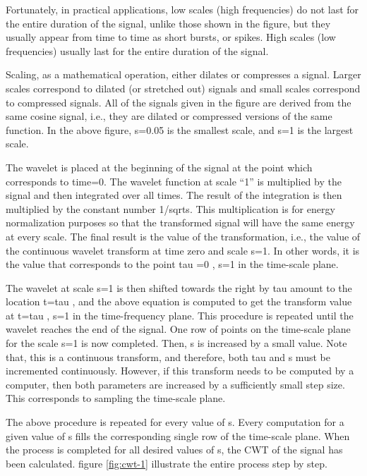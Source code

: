 \documentclass[12pt, a4paper, twoside]{report}
\begin{document}
Fortunately, in practical applications, low scales (high frequencies) do not last for the entire duration of the signal, unlike those shown in the figure, but they usually appear from time to time as short bursts, or spikes. High scales (low frequencies) usually last for the entire duration of the signal.
\par
Scaling, as a mathematical operation, either dilates or compresses a signal. Larger scales correspond to dilated (or stretched out) signals and small scales correspond to compressed signals. All of the signals given in the figure are derived from the same cosine signal, i.e., they are dilated or compressed versions of the same function. In the above figure, s=0.05 is the smallest scale, and s=1 is the largest scale.
\par
The wavelet is placed at the beginning of the signal at the point which corresponds to time=0. The wavelet function at scale ``1'' is multiplied by the signal and then integrated over all times. The result of the integration is then multiplied by the constant number 1/sqrt{s}. This multiplication is for energy normalization purposes so that the transformed signal will have the same energy at every scale. The final result is the value of the transformation, i.e., the value of the continuous wavelet transform at time zero and scale s=1. In other words, it is the value that corresponds to the point tau =0 , s=1 in the time-scale plane. 
\par
The wavelet at scale s=1 is then shifted towards the right by tau amount to the location t=tau , and the above equation is computed to get the transform value at t=tau , s=1 in the time-frequency plane. This procedure is repeated until the wavelet reaches the end of the signal. One row of points on the time-scale plane for the scale s=1 is now completed. Then, s is increased by a small value. Note that, this is a continuous transform, and therefore, both tau and s must be incremented continuously. However, if this transform needs to be computed by a computer, then both parameters are increased by a sufficiently small step size. This corresponds to sampling the time-scale plane.
\par
The above procedure is repeated for every value of s. Every computation for a given value of s fills the corresponding single row of the time-scale plane. When the process is completed for all desired values of s, the CWT of the signal has been calculated. figure \ref{fig:cwt-1} illustrate the entire process step by step.
\end{document}
